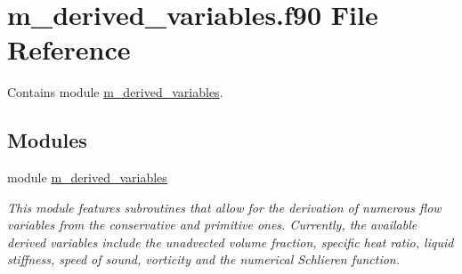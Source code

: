 \hypertarget{m__derived__variables_8f90}{}\section{m\+\_\+derived\+\_\+variables.\+f90 File Reference}
\label{m__derived__variables_8f90}


Contains module \hyperlink{namespacem__derived__variables}{m\+\_\+derived\+\_\+variables}.  


\subsection*{Modules}
\begin{DoxyCompactItemize}
\item 
module \hyperlink{namespacem__derived__variables}{m\+\_\+derived\+\_\+variables}
\begin{DoxyCompactList}\small\item\em This module features subroutines that allow for the derivation of numerous flow variables from the conservative and primitive ones. Currently, the available derived variables include the unadvected volume fraction, specific heat ratio, liquid stiffness, speed of sound, vorticity and the numerical Schlieren function. \end{DoxyCompactList}\end{DoxyCompactItemize}
